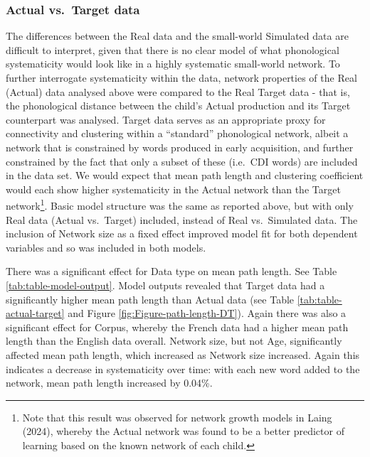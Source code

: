 \documentclass[
  man]{apa6}
\begin{document}
\subsubsection{Actual vs.~Target data}\label{actual-vs.-target-data}

The differences between the Real data and the small-world Simulated data are difficult to interpret, given that there is no clear model of what phonological systematicity would look like in a highly systematic small-world network. To further interrogate systematicity within the data, network properties of the Real (Actual) data analysed above were compared to the Real Target data - that is, the phonological distance between the child's Actual production and its Target counterpart was analysed. Target data serves as an appropriate proxy for connectivity and clustering within a ``standard'' phonological network, albeit a network that is constrained by words produced in early acquisition, and further constrained by the fact that only a subset of these (i.e.~CDI words) are included in the data set. We would expect that mean path length and clustering coefficient would each show higher systematicity in the Actual network than the Target network\footnote{Note that this result was observed for network growth models in Laing (2024), whereby the Actual network was found to be a better predictor of learning based on the known network of each child.}. Basic model structure was the same as reported above, but with only Real data (Actual vs.~Target) included, instead of Real vs.~Simulated data. The inclusion of Network size as a fixed effect improved model fit for both dependent variables and so was included in both models.

There was a significant effect for Data type on mean path length. See Table \ref{tab:table-model-output}. Model outputs revealed that Target data had a significantly higher mean path length than Actual data (see Table \ref{tab:table-actual-target} and Figure \ref{fig:Figure-path-length-DT}). Again there was also a significant effect for Corpus, whereby the French data had a higher mean path length than the English data overall. Network size, but not Age, significantly affected mean path length, which increased as Network size increased. Again this indicates a decrease in systematicity over time: with each new word added to the network, mean path length increased by 0.04\%.
\end{document}
